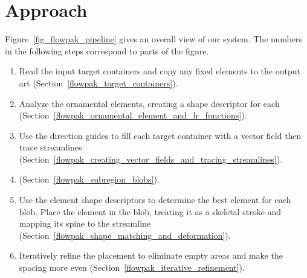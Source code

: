 \section{Approach}
\label{flowpak_approach}



Figure~\ref{fig_flowpak_pipeline} gives an overall view of our system. The numbers in the following
steps correspond to parts of the figure.


\begin{enumerate}
  \item Read the input target containers and
  copy any fixed elements to the output art (Section~\ref{flowpak_target_containers}).
  \item Analyze the ornamental elements, creating a shape descriptor for each
   (Section~\ref{flowpak_ornamental_element_and_lr_functions}).
  \item Use the direction guides to fill each target container with a vector field then trace streamlines 
  (Section~\ref{flowpak_creating_vector_fields_and_tracing_streamlines}).
  \item {} (Section~\ref{flowpak_subregion_blobs}).
  \item Use the element shape descriptors to determine the best element for each blob. 
        Place the element in the blob, treating it as a skeletal stroke and mapping its
        spine to the streamline (Section~\ref{flowpak_shape_matching_and_deformation}).
  \item Iteratively refine the placement to eliminate empty areas and make the spacing more even (Section~\ref{flowpak_iterative_refinement}).
\end{enumerate}

